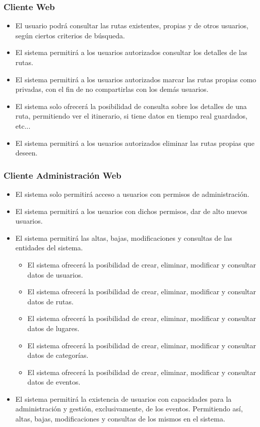\subsubsection*{Cliente Web}
\begin{itemize}
\setlength\itemsep{1pt}
\item El usuario podrá consultar las rutas existentes, propias y de otros usuarios, según ciertos criterios de búsqueda.
\item El sistema permitirá a los usuarios autorizados consultar los detalles de las rutas.
\item El sistema permitirá a los usuarios autorizados marcar las rutas propias como privadas, con el fin de no compartirlas con los demás usuarios.
\item El sistema solo ofrecerá la posibilidad de consulta sobre los detalles de una ruta, permitiendo ver el itinerario, si tiene datos en tiempo real guardados, etc...
\item El sistema permitirá a los usuarios autorizados eliminar las rutas propias que deseen.
\end{itemize}

\subsubsection*{Cliente Administración Web}
\begin{itemize}
\setlength\itemsep{1pt}
\item El sistema solo permitirá acceso a usuarios con permisos de administración.
\item El sistema permitirá a los usuarios con dichos permisos, dar de alto nuevos usuarios.
\item El sistema permitirá las altas, bajas, modificaciones y consultas de las entidades del sistema.
	\begin{itemize}
	\item El sistema ofrecerá la posibilidad de crear, eliminar, modificar y consultar datos de usuarios.
	\item El sistema ofrecerá la posibilidad de crear, eliminar, modificar y consultar datos de rutas.
	\item El sistema ofrecerá la posibilidad de crear, eliminar, modificar y consultar datos de lugares.
	\item El sistema ofrecerá la posibilidad de crear, eliminar, modificar y consultar datos de categorías.
	\item El sistema ofrecerá la posibilidad de crear, eliminar, modificar y consultar datos de eventos.
	\end{itemize}
\item El sistema permitirá la existencia de usuarios con capacidades para la administración y gestión, exclusivamente, de los eventos. Permitiendo así, altas, bajas, modificaciones y consultas de los mismos en el sistema.
\end{itemize}

